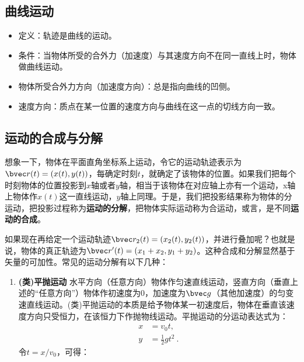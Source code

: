 

\subsection{曲线运动}

\begin{itemize}
\item 定义：轨迹是曲线的运动。
\item 条件：当物体所受的合外力（加速度）与其速度方向不在同一直线上时，物体做曲线运动。
\item 物体所受合外力方向（加速度方向）：总是指向曲线的凹侧。
\item 速度方向：质点在某一位置的速度方向与曲线在这一点的切线方向一致。
\end{itemize}

\subsection{运动的合成与分解}
想象一下，物体在平面直角坐标系上运动，令它的运动轨迹表示为$\bvec r(t)=(x(t),y(t))$，每确定时刻$t$，就确定了该物体的位置。如果我们把每个时刻物体的位置投影到$x$轴或者$y$轴，相当于该物体在对应轴上亦有一个运动，x轴上物体作$x(t)$这一直线运动，$y$轴上同理。于是，我们把投影结果称为物体的分运动，把投影过程称为\textbf{运动的分解}，把物体实际运动称为合运动，或言，是不同\textbf{运动的合成}。

如果现在再给定一个运动轨迹$\bvec r_2(t)=(x_2(t),y_2(t))$，并进行叠加呢？也就是说，物体的真正轨迹为$\bvec r'(t)=(x_1+x_2,y_1+y_2)$。这种合成和分解显然基于矢量的可加性。常见的运动分解有以下几种：
\begin{enumerate}
\item \textbf{ (类)平抛运动} 水平方向（任意方向）物体作匀速直线运动，竖直方向（垂直上述的“任意方向”）物体作初速度为$0$，加速度为$\bvec g$（其他加速度）的匀变速直线运动。(类)平抛运动的本质是给予物体某一初速度后，物体在垂直该速度方向只受恒力，在该恒力下作抛物线运动。平抛运动的分运动表达式为：
\begin{equation}
\begin{aligned}
x&=v_0t,\\
y&=\frac{1}{2}gt^2~.
\end{aligned}
\end{equation} 令$t=x/v_0$，可得：
\end{enumerate}

